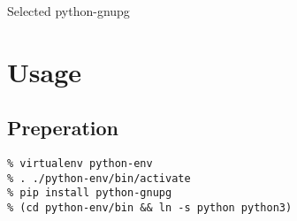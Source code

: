Selected python-gnupg


\section{Usage}

\subsection{Preperation}
\begin{verbatim}
% virtualenv python-env
% . ./python-env/bin/activate
% pip install python-gnupg
% (cd python-env/bin && ln -s python python3)
\end{verbatim}

